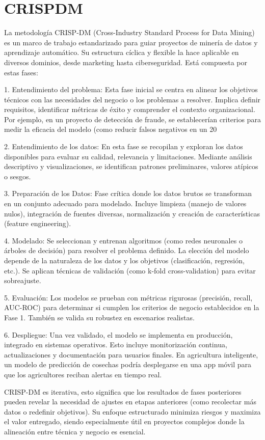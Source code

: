 
\section{CRISPDM}
La metodología CRISP-DM (Cross-Industry Standard Process for Data Mining) es un marco de trabajo estandarizado para guiar proyectos de minería de datos y aprendizaje automático. Su estructura cíclica y flexible la hace aplicable en diversos dominios, desde marketing hasta ciberseguridad. Está compuesta por estas fases:

1. Entendimiento del problema: Esta fase inicial se centra en alinear los objetivos técnicos con las necesidades del negocio o los problemas a resolver. Implica definir requisitos, identificar métricas de éxito y comprender el contexto organizacional. Por ejemplo, en un proyecto de detección de fraude, se establecerían criterios para medir la eficacia del modelo (como reducir falsos negativos en un 20%

2. Entendimiento de los datos: En esta fase se recopilan y exploran los datos disponibles para evaluar su calidad, relevancia y limitaciones. Mediante análisis descriptivo y visualizaciones, se identifican patrones preliminares, valores atípicos o sesgos.   

3. Preparación de los Datos: Fase crítica donde los datos brutos se transforman en un conjunto adecuado para modelado. Incluye limpieza (manejo de valores nulos), integración de fuentes diversas, normalización y creación de características (feature engineering).

4. Modelado: Se seleccionan y entrenan algoritmos (como redes neuronales o árboles de decisión) para resolver el problema definido. La elección del modelo depende de la naturaleza de los datos y los objetivos (clasificación, regresión, etc.). Se aplican técnicas de validación (como k-fold cross-validation) para evitar sobreajuste.  

5. Evaluación: Los modelos se prueban con métricas rigurosas (precisión, recall, AUC-ROC) para determinar si cumplen los criterios de negocio establecidos en la Fase 1. También se valida su robustez en escenarios realistas.

6. Despliegue: Una vez validado, el modelo se implementa en producción, integrado en sistemas operativos. Esto incluye monitorización continua, actualizaciones y documentación para usuarios finales. En agricultura inteligente, un modelo de predicción de cosechas podría desplegarse en una app móvil para que los agricultores reciban alertas en tiempo real.  

CRISP-DM es iterativa, esto significa que los resultados de fases posteriores pueden revelar la necesidad de ajustes en etapas anteriores (como recolectar más datos o redefinir objetivos). Su enfoque estructurado minimiza riesgos y maximiza el valor entregado, siendo especialmente útil en proyectos complejos donde la alineación entre técnica y negocio es esencial.